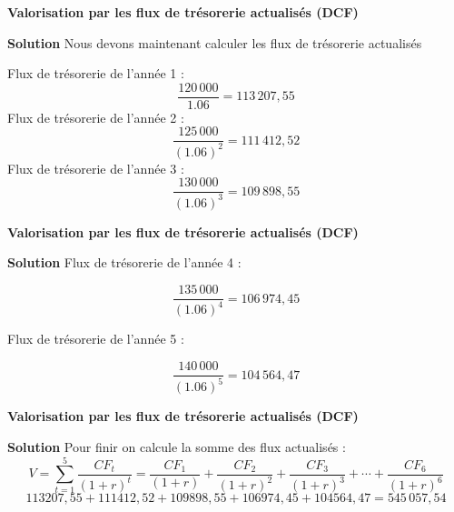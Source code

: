 \documentclass{beamer}
\begin{document}
\begin{frame}{\textbf{Valorisation par les flux de trésorerie actualisés (DCF)}}
	
	\begin{exampleblock}{\textbf{Solution}}
Nous devons maintenant calculer les flux de trésorerie actualisés
		
Flux de trésorerie de l'année 1 : 
\[ \frac{120\,000}{1.06}=113\,207,55\]
Flux de trésorerie de l'année 2 : 
\[ \frac{125\,000}{(1.06)^2}=111\,412,52 \]
Flux de trésorerie de l'année 3 : 
\[ \frac{130\,000}{(1.06)^3}=109\,898,55 \]

	
		
	\end{exampleblock}
	
	
\end{frame}

\begin{frame}{\textbf{Valorisation par les flux de trésorerie actualisés (DCF)}}
	
	\begin{exampleblock}{\textbf{Solution}}
Flux de trésorerie de l'année 4 : 
		
\[ \frac{135\,000}{(1.06)^4}=106\,974,45 \]

Flux de trésorerie de l'année 5 : 

\[ \frac{140\,000}{(1.06)^5}=104\,564,47 \]	

	\end{exampleblock}

\end{frame}

\begin{frame}{\textbf{Valorisation par les flux de trésorerie actualisés (DCF)}}
	
	\begin{exampleblock}{\textbf{Solution}}
Pour finir on calcule la somme des flux actualisés : 
	\[ V = \sum_{t=1}^5 \frac{CF_t}{(1+r)^t}= \frac{CF_1}{(1+r)}+\frac{CF_2}{(1+r)^2}+\frac{CF_3}{(1+r)^3}+\cdots+\frac{CF_6}{(1+r)^6}\]
	\[113207,55+111412,52+109898,55+ 106974,45+104564,47=545\,057,54 \]
		
	\end{exampleblock}
	

\end{frame}
\end{document}
